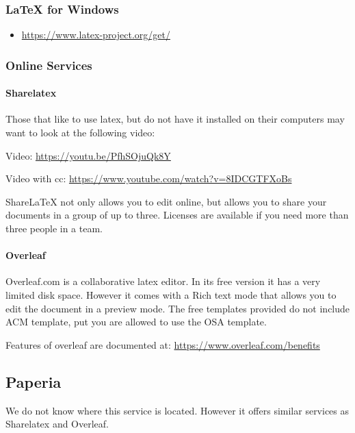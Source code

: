 \subsubsection{LaTeX for Windows}\label{latex-for-windows}

\begin{itemize}
\tightlist
\item
  \url{https://www.latex-project.org/get/}
\end{itemize}

\subsubsection{Online Services}\label{online-services}

\paragraph{Sharelatex}\label{sharelatex}

Those that like to use latex, but do not have it installed on their
computers may want to look at the following video:

Video: \url{https://youtu.be/PfhSOjuQk8Y}

Video with cc: \url{https://www.youtube.com/watch?v=8IDCGTFXoBs}

ShareLaTeX not only allows you to edit online, but allows you to share
your documents in a group of up to three. Licenses are available if you
need more than three people in a team.

\paragraph{Overleaf}\label{overleaf}

Overleaf.com is a collaborative latex editor. In its free version it has
a very limited disk space. However it comes with a Rich text mode that
allows you to edit the document in a preview mode. The free templates
provided do not include ACM template, put you are allowed to use the OSA
template.

Features of overleaf are documented at:
\url{https://www.overleaf.com/benefits}

\subsection{Paperia}\label{paperia}

We do not know where this service is located. However it offers similar
services as Sharelatex and Overleaf.

